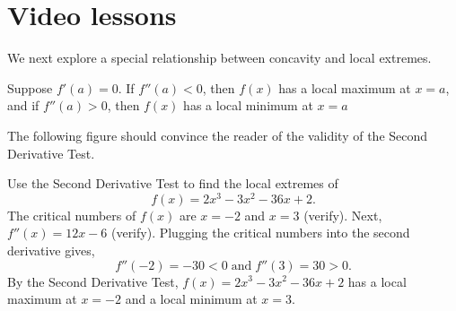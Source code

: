 \documentclass[handout]{ximera}
\begin{document}

\section{Video lessons}
\begin{center}
\begin{foldable}
\end{foldable}
\end{center}


We next explore a special relationship between concavity and local extremes.

\begin{theorem}
Suppose $f'(a) = 0$.
If $f''(a) < 0$, then $f(x)$ has a local maximum at $x = a$, and
if $f''(a) > 0$, then $f(x)$ has a local minimum at $x = a$
\end{theorem}

The following figure should convince the reader of the validity of the Second Derivative Test.


\begin{image}
\end{image}


\begin{example}[example 11]
Use the Second Derivative Test to find the local extremes of 
\[
f(x) = 2x^3 - 3x^2 - 36x +2.
\]
The critical numbers of $f(x)$ are $x = -2$ and $x = 3$ (verify).
Next, $f''(x) = 12x - 6$ (verify).
Plugging the critical numbers into the second derivative gives,
\[f''(-2) = -30 < 0 \; \text{and} \; f''(3) = 30 >0.\]
By the Second Derivative Test, $f(x) = 2x^3 - 3x^2 -36x +2$ has a local 
maximum at $x = -2$ and a local minimum at $x =3$.

\end{example}
\end{document}
